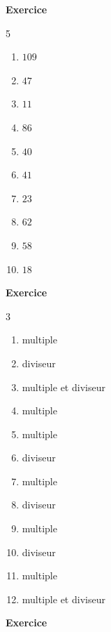 \documentclass[10pt,a4paper]{article}
\newcounter{nexo}
\begin{document}
\textbf{Exercice \thenexo} 
\begin{multicols}{5}
	\begin{enumerate}[label=\alph*)]
		\item $109$
		\item $47$
		\item $11$
		\item $86$
		\item $40$
		\item $41$
		\item $23$
		\item $62$
		\item $58$
		\item $18$
	\end{enumerate}
\end{multicols}
\textbf{Exercice \thenexo} 
\begin{multicols}{3}
	\begin{enumerate}[label=\alph*)]
		\item multiple
		\item diviseur
		\item multiple et diviseur
		\item multiple
		\item multiple 
		\item diviseur 
		\item multiple
		\item diviseur 
		\item multiple
		\item diviseur
		\item multiple
		\item multiple et diviseur
	\end{enumerate}
\end{multicols}
\textbf{Exercice \thenexo} 
\end{document}
